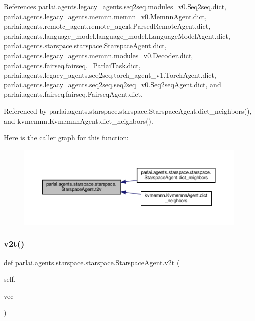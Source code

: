 References parlai.\+agents.\+legacy\+\_\+agents.\+seq2seq.\+modules\+\_\+v0.\+Seq2seq.\+dict, parlai.\+agents.\+legacy\+\_\+agents.\+memnn.\+memnn\+\_\+v0.\+Memnn\+Agent.\+dict, parlai.\+agents.\+remote\+\_\+agent.\+remote\+\_\+agent.\+Parsed\+Remote\+Agent.\+dict, parlai.\+agents.\+language\+\_\+model.\+language\+\_\+model.\+Language\+Model\+Agent.\+dict, parlai.\+agents.\+starspace.\+starspace.\+Starspace\+Agent.\+dict, parlai.\+agents.\+legacy\+\_\+agents.\+memnn.\+modules\+\_\+v0.\+Decoder.\+dict, parlai.\+agents.\+fairseq.\+fairseq.\+\_\+\+Parlai\+Task.\+dict, parlai.\+agents.\+legacy\+\_\+agents.\+seq2seq.\+torch\+\_\+agent\+\_\+v1.\+Torch\+Agent.\+dict, parlai.\+agents.\+legacy\+\_\+agents.\+seq2seq.\+seq2seq\+\_\+v0.\+Seq2seq\+Agent.\+dict, and parlai.\+agents.\+fairseq.\+fairseq.\+Fairseq\+Agent.\+dict.



Referenced by parlai.\+agents.\+starspace.\+starspace.\+Starspace\+Agent.\+dict\+\_\+neighbors(), and kvmemnn.\+Kvmemnn\+Agent.\+dict\+\_\+neighbors().

Here is the caller graph for this function\+:
\nopagebreak
\begin{figure}[H]
\begin{center}
\leavevmode
\includegraphics[width=350pt]{classparlai_1_1agents_1_1starspace_1_1starspace_1_1StarspaceAgent_ad38444615578df64d2e341b2ce37a012_icgraph}
\end{center}
\end{figure}
\mbox{\label{classparlai_1_1agents_1_1starspace_1_1starspace_1_1StarspaceAgent_a070074c4396b7ea6edc56e190e0c011f}} 
\subsubsection{\texorpdfstring{v2t()}{v2t()}}
{\footnotesize\ttfamily def parlai.\+agents.\+starspace.\+starspace.\+Starspace\+Agent.\+v2t (\begin{DoxyParamCaption}\item[{}]{self,  }\item[{}]{vec }\end{DoxyParamCaption})}

